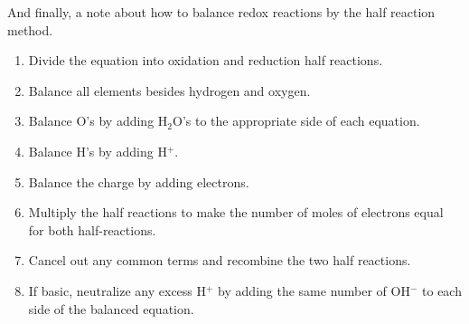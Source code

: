 \documentclass[../chem.tex]{subfiles}
\begin{document}
And finally, a note about how to balance redox reactions by the half reaction method.
\begin{enumerate}
    \item Divide the equation into oxidation and reduction half reactions.
    \item Balance all elements besides hydrogen and oxygen.
    \item Balance O's by adding H$_2$O's to the appropriate side of each equation.
    \item Balance H's by adding H$^+$.
    \item Balance the charge by adding electrons.
    \item Multiply the half reactions to make the number of moles of electrons equal for both half-reactions.
    \item Cancel out any common terms and recombine the two half reactions.
    \item If basic, neutralize any excess H$^+$ by adding the same number of OH$^-$ to each side of the balanced equation.
\end{enumerate}
\end{document}
